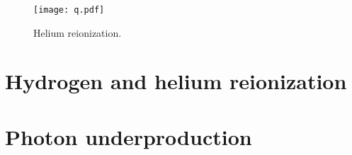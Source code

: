 \documentclass[a4paper,fleqn,usenatbib]{mnras}
\begin{document}

\begin{figure}
  \begin{center}
    \texttt{[image: q.pdf]}
  \end{center}
  \caption{Helium reionization.}
\end{figure}




\section{Hydrogen and helium reionization}

\section{Photon underproduction}
\end{document}
